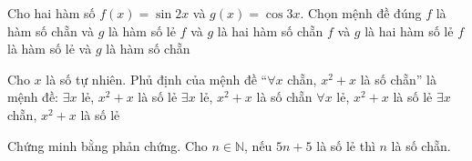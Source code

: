 \begin{ex}%
	Cho hai hàm số $f(x)=\sin 2x$ và $g(x)=\cos 3x$. Chọn mệnh đề  đúng
	 \choice
		{$f$ là hàm  số chẵn và $g$ là hàm số lẻ}
		 {$f$ và $g$ là hai hàm số chẵn}
		{$f$ và  $g$ là hai hàm số lẻ}
		{\True $f$ là hàm số  lẻ và $g$ là hàm số chẵn}
\end{ex}

\begin{ex}%
	Cho $x$ là số tự nhiên. Phủ định của mệnh đề  “$\forall x$ chẵn, $x^2+x$ là số chẵn” là mệnh đề:
	\choice 
		{$\exists x$ lẻ,  $x^2+x$ là số lẻ}
		{$\exists x$  lẻ, $x^2+x$ là số chẵn}
		{$\forall x$ lẻ, $x^2+x$  là số lẻ}
		{\True  $\exists x$ chẵn, $x^2+x$ là số lẻ}
\end{ex}

\begin{bt}%
	Chứng minh bằng  phản chứng. Cho $n \in \mathbb{N}$, nếu $5n+5$ là số lẻ thì $n$ là số chẵn.
\end{bt}
